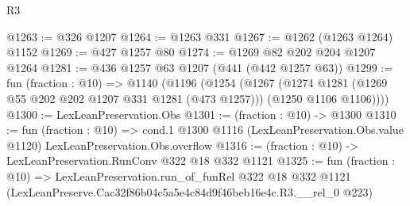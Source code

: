 \begin{lexlean}{R3}
\begin{coremodule}
@1263 := @326 @1207
@1264 := @1263 @331
@1267 := @1262 (@1263 @1264) @1152
@1269 := @427 @1257 @80
@1274 := @1269 @82 @202 @204 @1207 @1264
@1281 := @436 @1257 @63 @1207 (@441 (@442 @1257 @63))
@1299 := fun (fraction : @10) =>
  @1140
    (@1196
      (@1254
        (@1267
          (@1274 @1281 (@1269 @55 @202 @202 @1207 @331 @1281 (@473 @1257)))
          (@1250 @1106 @1106))))
@1300 := LexLeanPreservation.Obs
@1301 := (fraction : @10) -> @1300
@1310 := fun (fraction : @10) =>
  cond.{1} @1300 @1116 (LexLeanPreservation.Obs.value @1120) LexLeanPreservation.Obs.overflow
@1316 := (fraction : @10) -> LexLeanPreservation.RunConv @322 @18 @332 @1121
@1325 := fun (fraction : @10) =>
  LexLeanPreservation.run_of_funRel
    @322
    @18
    @332
    @1121
    (LexLeanPreserve.Cac32f86b04c5a5e4c84d9f46beb16e4c.R3.__rel_0 @223)
\end{coremodule}
\end{lexlean}
